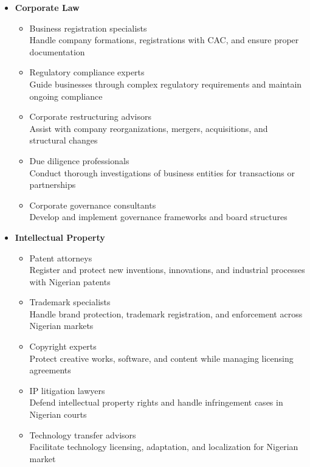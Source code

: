 \begin{tcolorbox}[
    colback=white,
    colframe=primarydark,
    title=\textbf{Legal Service Categories},
    before skip=1em,
    after skip=1em
]
    \begin{itemize}[leftmargin=*,itemsep=0.5em]
        \item \textbf{Corporate Law}
        \begin{itemize}[itemsep=0.3em]
            \item Business registration specialists \\
                \small{Handle company formations, registrations with CAC, and ensure proper documentation}
            \item Regulatory compliance experts \\
                \small{Guide businesses through complex regulatory requirements and maintain ongoing compliance}
            \item Corporate restructuring advisors \\
                \small{Assist with company reorganizations, mergers, acquisitions, and structural changes}
            \item Due diligence professionals \\
                \small{Conduct thorough investigations of business entities for transactions or partnerships}
            \item Corporate governance consultants \\
                \small{Develop and implement governance frameworks and board structures}
        \end{itemize}

        \vspace{0.5em}

        \item \textbf{Intellectual Property}
        \begin{itemize}[itemsep=0.3em]
            \item Patent attorneys \\
                \small{Register and protect new inventions, innovations, and industrial processes with Nigerian patents}
            \item Trademark specialists \\
                \small{Handle brand protection, trademark registration, and enforcement across Nigerian markets}
            \item Copyright experts \\
                \small{Protect creative works, software, and content while managing licensing agreements}
            \item IP litigation lawyers \\
                \small{Defend intellectual property rights and handle infringement cases in Nigerian courts}
            \item Technology transfer advisors \\
                \small{Facilitate technology licensing, adaptation, and localization for Nigerian market}
        \end{itemize}


\end{itemize}
\end{tcolorbox}
